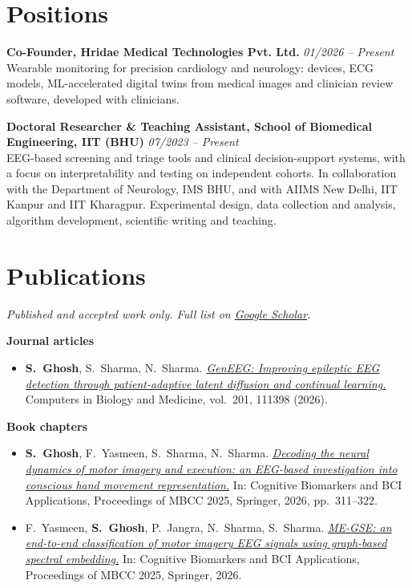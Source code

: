 \documentclass[10pt,a4paper]{article}
\newcommand{\project}[3]{
  \noindent\textbf{#1} \hfill \textit{\small #2} \\
  {\small #3} \par
  \vspace{4pt}
}
\newcommand{\me}{\textbf{S.~Ghosh}}
\begin{document}
\section{Positions}
\project{Co-Founder, Hridae Medical Technologies Pvt. Ltd.}{01/2026 -- Present}
{Wearable monitoring for precision cardiology and neurology: devices, ECG models, ML-accelerated digital twins from medical images and clinician review software, developed with clinicians.}

\project{Doctoral Researcher \& Teaching Assistant, School of Biomedical Engineering, IIT (BHU)}{07/2023 -- Present}
{EEG-based screening and triage tools and clinical decision-support systems, with a focus on interpretability and testing on independent cohorts. In collaboration with the Department of Neurology, IMS BHU, and with AIIMS New Delhi, IIT Kanpur and IIT Kharagpur. Experimental design, data collection and analysis, algorithm development, scientific writing and teaching.}

\vspace{8pt}

\section{Publications}
\textit{\small Published and accepted work only. Full list on \href{https://scholar.google.com/citations?user=l9U73kcAAAAJ&hl=en}{Google Scholar}.}

\vspace{2pt}
\noindent\textbf{\small Journal articles}
\begin{itemize}
    \item \me, S.~Sharma, N.~Sharma. \href{https://doi.org/10.1016/j.compbiomed.2025.111398}{\textit{GenEEG: Improving epileptic EEG detection through patient-adaptive latent diffusion and continual learning.}} Computers in Biology and Medicine, vol.~201, 111398 (2026).
\end{itemize}

\noindent\textbf{\small Book chapters}
\begin{itemize}
    \item \me, F.~Yasmeen, S.~Sharma, N.~Sharma. \href{https://doi.org/10.1007/978-3-032-20634-3_28}{\textit{Decoding the neural dynamics of motor imagery and execution: an EEG-based investigation into conscious hand movement representation.}} In: Cognitive Biomarkers and BCI Applications, Proceedings of MBCC 2025, Springer, 2026, pp.~311--322.
    \item F.~Yasmeen, \me, P.~Jangra, N.~Sharma, S.~Sharma. \href{https://doi.org/10.1007/978-3-032-20634-3_21}{\textit{ME-GSE: an end-to-end classification of motor imagery EEG signals using graph-based spectral embedding.}} In: Cognitive Biomarkers and BCI Applications, Proceedings of MBCC 2025, Springer, 2026.
\end{itemize}
\end{document}
